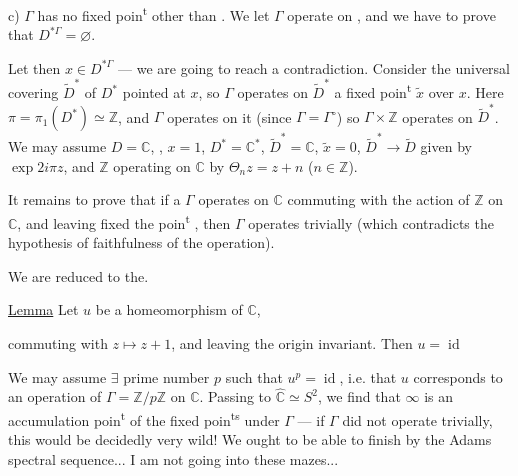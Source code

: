  c) $\Gamma$ has no fixed poin\textsuperscript{t} other than . We let $\Gamma$ operate  on , and we have to prove that $D^{*\Gamma}=\varnothing$.



Let then $x\in D^{*\Gamma}$ --- we are going to reach a contradiction. Consider the universal covering $\widetilde D^*$ of $D^*$ pointed at $x$,  so $\Gamma$ operates on $\widetilde D^*$  a fixed poin\textsuperscript{t} $\widetilde x$ over $x$. Here $\pi=\pi_1(D^*)\simeq\mathbb Z$, and $\Gamma$ operates on it  (since $\Gamma=\Gamma^\circ$) so $\Gamma\times\mathbb Z$ operates on $\widetilde D^*$. We may assume $D=\mathbb C$, , $x=1$, $D^*=\mathbb C^*$, $\widetilde D^*=\mathbb C$, $\widetilde x=0$, $\widetilde D^*\longrightarrow\widetilde D$ given by $\exp 2i\pi z$,  and $\mathbb Z$ operating on $\mathbb C$ by $\Theta_nz=z+n$ ($n\in\mathbb Z$).

 It remains to prove that if a  $\Gamma$ operates on $\mathbb C$ commuting  with the action of $\mathbb Z$ on $\mathbb C$, and leaving  fixed the poin\textsuperscript{t} , then $\Gamma$ operates trivially (which contradicts the hypothesis of faithfulness of the operation).

 We are reduced to the.

\uline{Lemma} Let $u$ be a homeomorphism  of $\mathbb C$,



commuting with $z\longmapsto z+1$, and leaving the origin invariant. Then $u=\operatorname{id}$

We may assume  $\exists$ prime number $p$ such that $u^p=\operatorname{id}$, i.e. that $u$ corresponds to an operation of $\Gamma=\mathbb Z/p\mathbb Z$ on $\mathbb C$.  Passing to $\widehat{\mathbb C}\simeq S^2$, we find that $\infty$ is an accumulation poin\textsuperscript{t} of the fixed poin\textsuperscript{ts} under $\Gamma$ --- if $\Gamma$ did not operate trivially, this would be decidedly very wild! We ought to be able to finish by the Adams spectral sequence... I am not going into these mazes...

